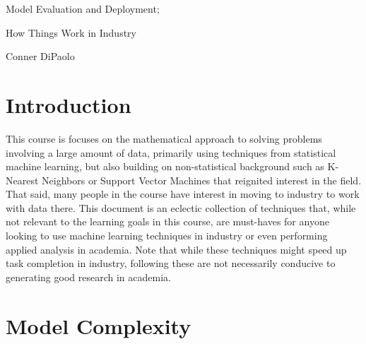 \documentclass[12pt,letterpaper]{article}
\begin{document}
\begin{center}
    \large Model Evaluation and Deployment;

    \large How Things Work in Industry

    \normalsize Conner DiPaolo
\end{center}
\vspace{3\baselineskip}

\section{Introduction}

This course is focuses on the mathematical approach to solving problems
involving a large amount of data, primarily using techniques from statistical
machine learning, but also building on non-statistical background such as
K-Nearest Neighbors or Support Vector Machines that reignited interest in
the field. That said, many people in the course have interest in moving to
industry to work with data there. This document is an eclectic collection
of techniques that, while not relevant to the learning goals in this course,
are must-haves for anyone looking to use machine learning techniques in industry
or even performing applied analysis in academia. Note that while these techniques
might speed up task completion in industry, following these are not necessarily
conducive to generating good research in academia.

\section{Model Complexity}
\end{document}
